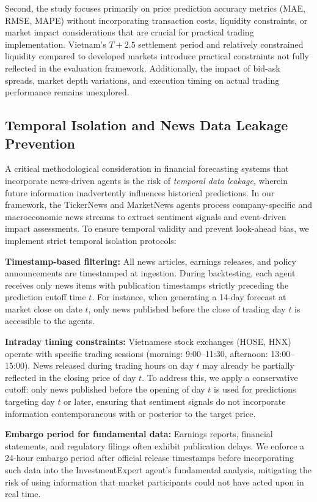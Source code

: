\documentclass{ieeeaccess}
\begin{document}
Second, the study focuses primarily on price prediction accuracy metrics (MAE, RMSE, MAPE) without incorporating transaction costs, liquidity constraints, or market impact considerations that are crucial for practical trading implementation. Vietnam's $T+2.5$ settlement period and relatively constrained liquidity compared to developed markets introduce practical constraints not fully reflected in the evaluation framework. Additionally, the impact of bid-ask spreads, market depth variations, and execution timing on actual trading performance remains unexplored.

\subsection{Temporal Isolation and News Data Leakage Prevention}
A critical methodological consideration in financial forecasting systems that incorporate news-driven agents is the risk of \textit{temporal data leakage}, wherein future information inadvertently influences historical predictions. In our framework, the TickerNews and MarketNews agents process company-specific and macroeconomic news streams to extract sentiment signals and event-driven impact assessments. To ensure temporal validity and prevent look-ahead bias, we implement strict temporal isolation protocols:

\textbf{Timestamp-based filtering:} All news articles, earnings releases, and policy announcements are timestamped at ingestion. During backtesting, each agent receives only news items with publication timestamps strictly preceding the prediction cutoff time $t$. For instance, when generating a 14-day forecast at market close on date $t$, only news published before the close of trading day $t$ is accessible to the agents.

\textbf{Intraday timing constraints:} Vietnamese stock exchanges (HOSE, HNX) operate with specific trading sessions (morning: 9:00--11:30, afternoon: 13:00--15:00). News released during trading hours on day $t$ may already be partially reflected in the closing price of day $t$. To address this, we apply a conservative cutoff: only news published before the opening of day $t$ is used for predictions targeting day $t$ or later, ensuring that sentiment signals do not incorporate information contemporaneous with or posterior to the target price.

\textbf{Embargo period for fundamental data:} Earnings reports, financial statements, and regulatory filings often exhibit publication delays. We enforce a 24-hour embargo period after official release timestamps before incorporating such data into the InvestmentExpert agent's fundamental analysis, mitigating the risk of using information that market participants could not have acted upon in real time.
\end{document}

